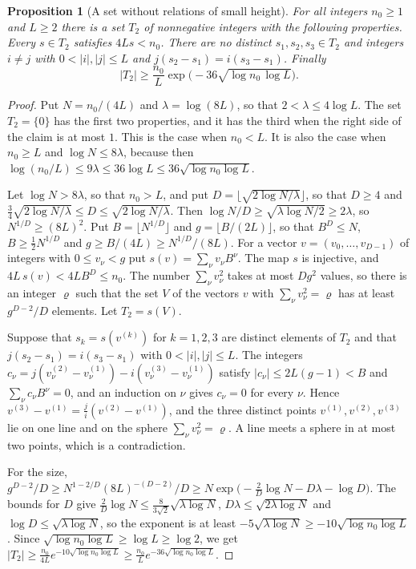 \documentclass[11pt,letterpaper]{article}
\newtheorem{proposition}[theorem]{Proposition}
\numberwithin{equation}{section}
\begin{document}
\begin{proposition}[A set without relations of small height]\label{behrend}
For all integers $n_0\ge1$ and $L\ge2$ there is a set $T_2$ of nonnegative integers with the following properties. Every $s\in T_2$ satisfies $4Ls<n_0$. There are no distinct $s_1,s_2,s_3\in T_2$ and integers $i\ne j$ with $0<|i|,|j|\le L$ and $j(s_2-s_1)=i(s_3-s_1)$. Finally
\[
|T_2|\ge\frac{n_0}L\exp\Big(-36\sqrt{\log n_0\,\log L}\Big).
\]
\end{proposition}
\begin{proof}
Put $N=n_0/(4L)$ and $\lambda=\log(8L)$, so that $2<\lambda\le4\log L$. The set $T_2=\{0\}$ has the first two properties, and it has the third when the right side of the claim is at most $1$. This is the case when $n_0<L$. It is also the case when $n_0\ge L$ and $\log N\le8\lambda$, because then $\log(n_0/L)\le9\lambda\le36\log L\le36\sqrt{\log n_0\log L}$.

Let $\log N>8\lambda$, so that $n_0>L$, and put $D=\lfloor\sqrt{2\log N/\lambda}\rfloor$, so that $D\ge4$ and $\tfrac34\sqrt{2\log N/\lambda}\le D\le\sqrt{2\log N/\lambda}$. Then $\log N/D\ge\sqrt{\lambda\log N/2}\ge2\lambda$, so $N^{1/D}\ge(8L)^2$. Put $B=\lfloor N^{1/D}\rfloor$ and $g=\lfloor B/(2L)\rfloor$, so that $B^D\le N$, $B\ge\tfrac12N^{1/D}$ and $g\ge B/(4L)\ge N^{1/D}/(8L)$. For a vector $v=(v_0,\dots,v_{D-1})$ of integers with $0\le v_\nu<g$ put $s(v)=\sum_\nu v_\nu B^\nu$. The map $s$ is injective, and $4L\,s(v)<4LB^D\le n_0$. The number $\sum_\nu v_\nu^2$ takes at most $Dg^2$ values, so there is an integer $\varrho$ such that the set $V$ of the vectors $v$ with $\sum_\nu v_\nu^2=\varrho$ has at least $g^{D-2}/D$ elements. Let $T_2=s(V)$.

Suppose that $s_k=s(v^{(k)})$ for $k=1,2,3$ are distinct elements of $T_2$ and that $j(s_2-s_1)=i(s_3-s_1)$ with $0<|i|,|j|\le L$. The integers $c_\nu=j(v^{(2)}_\nu-v^{(1)}_\nu)-i(v^{(3)}_\nu-v^{(1)}_\nu)$ satisfy $|c_\nu|\le2L(g-1)<B$ and $\sum_\nu c_\nu B^\nu=0$, and an induction on $\nu$ gives $c_\nu=0$ for every $\nu$. Hence $v^{(3)}-v^{(1)}=\tfrac ji(v^{(2)}-v^{(1)})$, and the three distinct points $v^{(1)},v^{(2)},v^{(3)}$ lie on one line and on the sphere $\sum_\nu v_\nu^2=\varrho$. A line meets a sphere in at most two points, which is a contradiction.

For the size, $g^{D-2}/D\ge N^{1-2/D}(8L)^{-(D-2)}/D\ge N\exp\big(-\tfrac2D\log N-D\lambda-\log D\big)$. The bounds for $D$ give $\tfrac2D\log N\le\tfrac8{3\sqrt2}\sqrt{\lambda\log N}$, $D\lambda\le\sqrt{2\lambda\log N}$ and $\log D\le\sqrt{\lambda\log N}$, so the exponent is at least $-5\sqrt{\lambda\log N}\ge-10\sqrt{\log n_0\log L}$. Since $\sqrt{\log n_0\log L}\ge\log L\ge\log2$, we get $|T_2|\ge\tfrac{n_0}{4L}e^{-10\sqrt{\log n_0\log L}}\ge\tfrac{n_0}Le^{-36\sqrt{\log n_0\log L}}$.
\end{proof}
\end{document}
